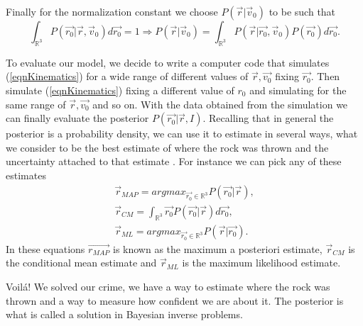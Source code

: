 \documentclass[12pt]{book}
\begin{document}
Finally for the normalization constant we choose $P(\vec{r}|\vec{v}_{0})$ to be such that
\begin{equation*}
\int_{\mathbb{R}^{3}}P(\vec{r_{0}}|\vec{r},\vec{v}_{0})d\vec{r_{0}}=1\Rightarrow 
P(\vec{r}|\vec{v}_{0})=\int_{\mathbb{R}^{3}}P(\vec{r}|\vec{r_{0}},\vec{v}_{0})P(\vec{r_{0}})d\vec{r_{0}}.
\end{equation*} 


To evaluate our model, we decide to write a computer code that simulates (\ref{eqnKinematics}) for a wide range of different values
of $\vec{r},\vec{v_{0}}$ fixing $\vec{r_{0}}$. Then simulate (\ref{eqnKinematics}) fixing a different value 
of $r_{0}$ and simulating for the same range of $\vec{r},\vec{v_{0}}$ and so on. With the data obtained from
the simulation we can finally evaluate the posterior $P(\vec{r_{0}}|\vec{r},I)$. Recalling that in general
the posterior is a probability density, we can use it to estimate in several ways, what we consider to be
the best estimate of where the rock was thrown and the  uncertainty attached to that estimate .
 For instance we can pick
any of these estimates \cite{Somersalo}
\begin{eqnarray*}
\vec{r}_{MAP}=argmax_{\vec{r_{0}}\in\mathbb{R}^{3}} P(\vec{r_{0}}|\vec{r}), \\ 
\vec{r}_{CM}=\int_{\mathbb{R}^{3}} \vec{r_{0}}P(\vec{r_{0}}|\vec{r})d\vec{r_{0}},\\
\vec{r}_{ML}=argmax_{\vec{r_{0}}\in\mathbb{R}^{3}}P(\vec{r}|\vec{r_{0}}).
\end{eqnarray*} 
In these equations $\vec{r_{MAP}}$ is known as the maximum a posteriori estimate, $\vec{r}_{CM}$ is the 
conditional mean estimate and $\vec{r}_{ML}$ is the maximum likelihood estimate.
\newline

Voil{\'a}! We solved our crime, we have a way to estimate where the rock was thrown and a way to measure how
confident we are about it. The posterior is what is called a solution in Bayesian inverse problems.
\newline
\end{document}
